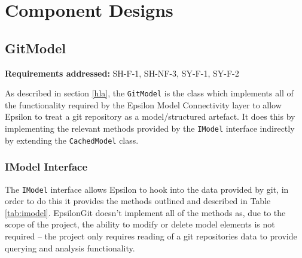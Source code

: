 \documentclass[11pt]{book}
\newcommand{\code}[1]{\texttt{#1}}
\begin{document}
\section{Component Designs}
\subsection{GitModel}
\begin{tcolorbox}
\textbf{Requirements addressed:}  SH-F-1, SH-NF-3, SY-F-1, SY-F-2
\end{tcolorbox}

As described in section \ref{hla}, the \code{GitModel} is the class which implements all of the functionality required by the Epsilon Model Connectivity layer to allow Epsilon to treat a git repository as a model/structured artefact. It does this by implementing the relevant methods provided by the \code{IModel} interface indirectly by extending the \code{CachedModel} class.

\subsubsection{IModel Interface}
The \code{IModel} interface allows Epsilon to hook into the data provided by git, in order to do this it provides the methods outlined and described in Table \ref{tab:imodel}. EpsilonGit doesn't implement all of the methods as, due to the scope of the project, the ability to modify or delete model elements is not required -- the project only requires reading of a git repositories data to provide querying and analysis functionality.
\end{document}

